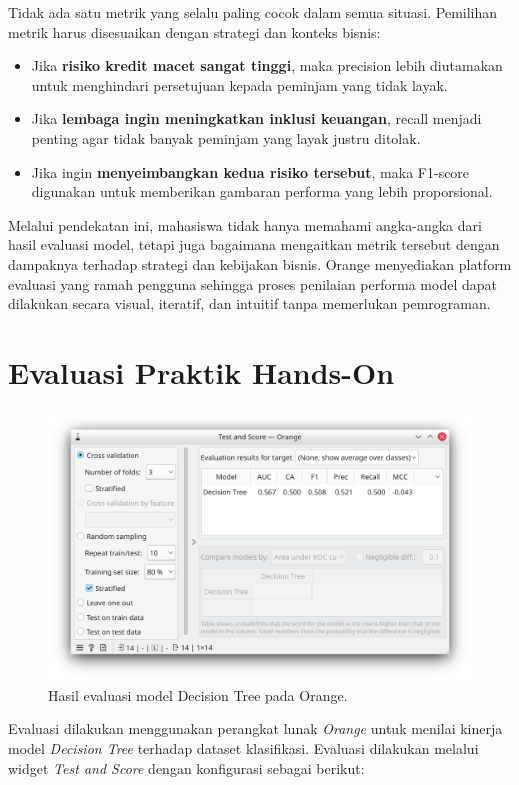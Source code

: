 Tidak ada satu metrik yang selalu paling cocok dalam semua situasi. Pemilihan metrik harus disesuaikan dengan strategi dan konteks bisnis:

\begin{itemize}
	\item Jika \textbf{risiko kredit macet sangat tinggi}, maka precision lebih diutamakan untuk menghindari persetujuan kepada peminjam yang tidak layak.
	\item Jika \textbf{lembaga ingin meningkatkan inklusi keuangan}, recall menjadi penting agar tidak banyak peminjam yang layak justru ditolak.
	\item Jika ingin \textbf{menyeimbangkan kedua risiko tersebut}, maka F1-score digunakan untuk memberikan gambaran performa yang lebih proporsional.
\end{itemize}

Melalui pendekatan ini, mahasiswa tidak hanya memahami angka-angka dari hasil evaluasi model, tetapi juga bagaimana mengaitkan metrik tersebut dengan dampaknya terhadap strategi dan kebijakan bisnis. Orange menyediakan platform evaluasi yang ramah pengguna sehingga proses penilaian performa model dapat dilakukan secara visual, iteratif, dan intuitif tanpa memerlukan pemrograman.

\section{Evaluasi Praktik Hands-On}

\begin{figure}[h]
	\centering
	\includegraphics[width=0.9\linewidth]{../figures/decision_tree_results.png}
	\caption{Hasil evaluasi model Decision Tree pada Orange.}
\end{figure}

Evaluasi dilakukan menggunakan perangkat lunak \textit{Orange} untuk menilai kinerja model \textit{Decision Tree} terhadap dataset klasifikasi. Evaluasi dilakukan melalui widget \textit{Test and Score} dengan konfigurasi sebagai berikut:

